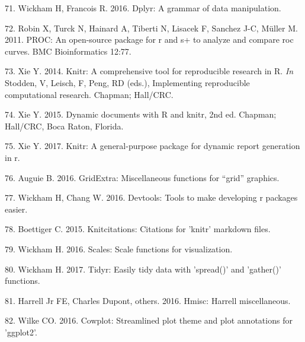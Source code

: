 \documentclass[11pt,]{article}
\begin{document}
\hypertarget{ref-dplyr}{}
71. Wickham H, Francois R. 2016. Dplyr: A grammar of data manipulation.

\hypertarget{ref-pROC}{}
72. Robin X, Turck N, Hainard A, Tiberti N, Lisacek F, Sanchez J-C,
Müller M. 2011. PROC: An open-source package for r and s+ to analyze and
compare roc curves. BMC Bioinformatics 12:77.

\hypertarget{ref-knitr2014}{}
73. Xie Y. 2014. Knitr: A comprehensive tool for reproducible research
in R. \emph{In} Stodden, V, Leisch, F, Peng, RD (eds.), Implementing
reproducible computational research. Chapman; Hall/CRC.

\hypertarget{ref-knitr2015}{}
74. Xie Y. 2015. Dynamic documents with R and knitr, 2nd ed. Chapman;
Hall/CRC, Boca Raton, Florida.

\hypertarget{ref-knitr2017}{}
75. Xie Y. 2017. Knitr: A general-purpose package for dynamic report
generation in r.

\hypertarget{ref-gridExtra}{}
76. Auguie B. 2016. GridExtra: Miscellaneous functions for ``grid''
graphics.

\hypertarget{ref-devtools}{}
77. Wickham H, Chang W. 2016. Devtools: Tools to make developing r
packages easier.

\hypertarget{ref-knitcitations}{}
78. Boettiger C. 2015. Knitcitations: Citations for 'knitr' markdown
files.

\hypertarget{ref-scales}{}
79. Wickham H. 2016. Scales: Scale functions for visualization.

\hypertarget{ref-tidyr}{}
80. Wickham H. 2017. Tidyr: Easily tidy data with 'spread()' and
'gather()' functions.

\hypertarget{ref-Hmisc}{}
81. Harrell Jr FE, Charles Dupont, others. 2016. Hmisc: Harrell
miscellaneous.

\hypertarget{ref-cowplot}{}
82. Wilke CO. 2016. Cowplot: Streamlined plot theme and plot annotations
for 'ggplot2'.
\end{document}

